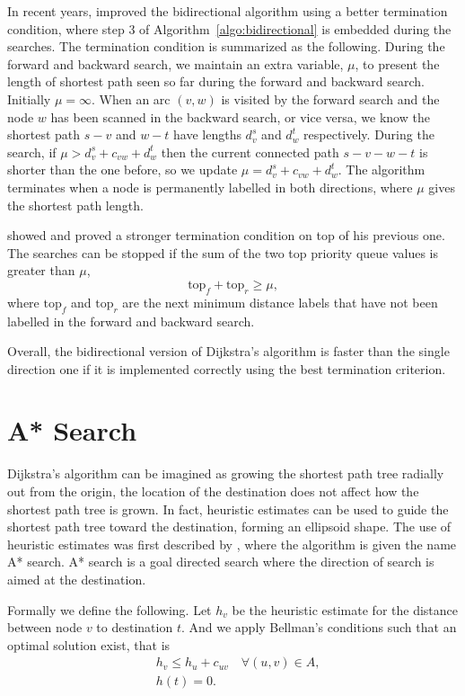 In recent years,
\citet{Goldberg05} improved the bidirectional algorithm using a better termination condition,
where step 3 of Algorithm~\ref{algo:bidirectional} is embedded during the searches.
The termination condition is summarized as the following.
During the forward and backward search,
we maintain an extra variable, $\mu$, to present the length of shortest path seen so far during the forward and backward search.
Initially $\mu = \infty$.
When an arc $(v,w)$ is visited by the forward search and the node $w$ has been scanned in the backward search, or vice versa,
we know the shortest path $s-v$ and $w-t$ have lengths $d_v^s$ and $d_w^t$ respectively.
During the search, if $\mu > d_v^s + c_{vw} + d_w^t$ then the current connected path $s-v-w-t$ is shorter than the one before, 
so we update $\mu = d_v^s + c_{vw} + d_w^t$.
The algorithm terminates when a node is permanently labelled in both directions,
where $\mu$ gives the shortest path length.

\citet{GoldbergEPP} showed and proved a stronger termination condition on top of his previous one.
The searches can be stopped if the sum of the two top priority queue values is greater than $\mu$,
\[
    \text{top}_f + \text{top}_r \geq \mu,
\]
where $\text{top}_f$ and $\text{top}_r$ are the next minimum distance labels that have not been labelled in the forward and backward search.

Overall, the bidirectional version of Dijkstra's algorithm is faster than the single direction one if it is implemented correctly using the best termination criterion.

\section{A* Search}\label{section:A*}
Dijkstra's algorithm can be imagined as growing the shortest path tree radially out from the origin,
the location of the destination does not affect how the shortest path tree is grown.
In fact, heuristic estimates can be used to guide the shortest path tree toward the destination,
forming an ellipsoid shape.
The use of heuristic estimates was first described by \citet{Astar},
where the algorithm is given the name A* search.
A* search is a goal directed search where the direction of search is aimed at the destination.


Formally we define the following.
Let $h_v$ be the heuristic estimate for the distance between node $v$ to destination $t$.
And we apply Bellman's conditions such that an optimal solution exist, that is 
\begin{align}
    &h_v \leq h_u + c_{uv} \quad \forall(u,v) \in A, \\
    &h(t) = 0.
\end{align}

